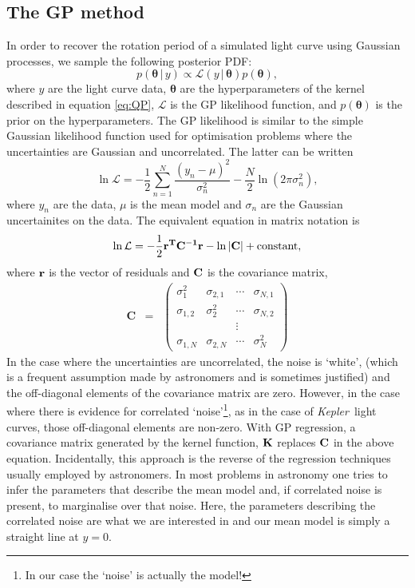\documentclass[useAMS, usenatbib, preprint, 12pt]{aastex}
\newcommand{\Kepler}{{\it Kepler}}
\begin{document}
\subsection{The GP method}

In order to recover the rotation period of a simulated light curve using
Gaussian processes, we sample the following posterior PDF:
\begin{equation}
p({\bm \theta}\,|\,y) \propto \mathcal L(y\,|\,{\bm \theta}) p({\bm \theta}),
\end{equation}
\label{eq:posterior}
where $y$ are the light curve data, $\bm \theta$ are the hyperparameters
of the kernel described in equation \ref{eq:QP}, $\mathcal L$ is the
GP likelihood function, and $p({\bm \theta})$ is the prior on the
hyperparameters.  The GP likelihood is similar to the simple Gaussian likelihood
function used for optimisation problems where the uncertainties are
Gaussian and uncorrelated. The latter can be written
\begin{equation}
\ln \mathcal{L} = -\frac{1}{2}\sum_{n=1}^N\frac{(y_n-\mu)^2}{\sigma_n^2}
    - \frac{N}{2}\ln(2\pi\sigma_n^2),
\end{equation}
\label{eq:chi2}
where $y_n$ are the data, $\mu$ is the mean model and $\sigma_n$ are the
Gaussian uncertainites on the data.
The equivalent equation in matrix notation is
\begin{equation}
\ln \mathcal{L} = -\frac{1}{2}\bf{r}^T\bf{C}^{-1}\bf{r}-\ln|\bf{C}|
    + \mathrm{constant},
\end{equation}
\label{eq:lhf1}
where $\bf{r}$ is the vector of residuals and $\bf{C}$ is the covariance
matrix,
\begin{eqnarray}
	\mathbf{C} &=& \left (\begin{array}{cccc}
	\sigma^2_1 & \sigma_{2, 1} & \cdots & \sigma_{N, 1} \\
	\sigma_{1, 2} & \sigma^2_2 & \cdots & \sigma_{N, 2} \\
    && \vdots & \\
	\sigma_{1, N} & \sigma_{2, N} & \cdots & \sigma^2_N
\end{array}\right )
\end{eqnarray}
In the case where the uncertainties are uncorrelated, the noise is `white',
(which is a frequent assumption made by astronomers and is sometimes
justified) and the off-diagonal elements of the covariance matrix are zero.
However, in the case where there is evidence for correlated
`noise'\footnote{In our case the `noise' is actually the model!}, as in the
case of \Kepler\ light curves, those off-diagonal elements are non-zero.
With GP regression, a covariance matrix generated by the kernel function,
${\bf K}$ replaces ${\bf C}$ in the above equation.
Incidentally, this approach is the reverse of the regression techniques
usually employed by astronomers.
In most problems in astronomy one tries to infer the parameters that describe
the mean model and, if correlated noise is present, to marginalise over that
noise.
Here, the parameters describing the correlated noise are what we are
interested in and our mean model is simply a straight line at $y=0$.
\end{document}
